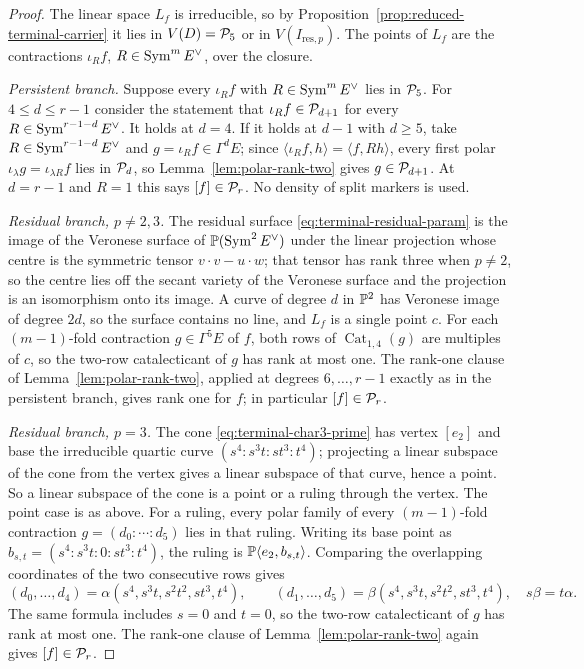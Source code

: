 \begin{proof}
The linear space \(L_f\) is irreducible, so by
Proposition~\ref{prop:reduced-terminal-carrier} it lies in \(V(D)=\mathcal P_5\) or
in \(V(I_{\mathrm{res},p})\).  The points of \(L_f\) are the contractions
\(\iota_Rf\), \(R\in\operatorname{Sym}^mE^\vee\), over the closure.

\emph{Persistent branch.}  Suppose every \(\iota_Rf\) with
\(R\in\operatorname{Sym}^mE^\vee\) lies in \(\mathcal P_5\).  For \(4\leq d\leq r-1\) consider the
statement that \(\iota_Rf\in\mathcal P_{d+1}\) for every
\(R\in\operatorname{Sym}^{r-1-d}E^\vee\).  It holds at \(d=4\).  If it holds at \(d-1\)
with \(d\geq5\), take \(R\in\operatorname{Sym}^{r-1-d}E^\vee\) and \(g=\iota_Rf\in\Gamma^dE\);
since \(\langle\iota_Rf,h\rangle=\langle f,Rh\rangle\), every first polar
\(\iota_\lambda g=\iota_{\lambda R}f\) lies in \(\mathcal P_d\), so
Lemma~\ref{lem:polar-rank-two} gives \(g\in\mathcal P_{d+1}\).  At \(d=r-1\) and
\(R=1\) this says \([f]\in\mathcal P_r\).  No density of split markers is used.

\emph{Residual branch, \(p\neq2,3\).}  The residual surface
\eqref{eq:terminal-residual-param} is the image of the Veronese surface of
\(\mathbb P(\operatorname{Sym}^2E^\vee)\) under the linear projection whose centre is the
symmetric tensor \(v\cdot v-u\cdot w\); that tensor has rank three when
\(p\neq2\), so the centre lies off the secant variety of the Veronese
surface and the projection is an isomorphism onto its image.  A curve of
degree \(d\) in \(\mathbb P^2\) has Veronese image of degree \(2d\), so the
surface contains no line, and \(L_f\) is a single point \(c\).  For each
\((m-1)\)-fold contraction \(g\in\Gamma^5E\) of \(f\), both rows of
\(\operatorname{Cat}_{1,4}(g)\) are multiples of \(c\), so the two-row
catalecticant of \(g\) has rank at most one.  The rank-one clause of
Lemma~\ref{lem:polar-rank-two}, applied at degrees \(6,\ldots,r-1\) exactly
as in the persistent branch, gives rank one for \(f\); in particular
\([f]\in\mathcal P_r\).

\emph{Residual branch, \(p=3\).}  The cone \eqref{eq:terminal-char3-prime}
has vertex \([e_2]\) and base the irreducible quartic curve
\((s^4:s^3t:st^3:t^4)\); projecting a linear subspace of the cone from the
vertex gives a linear subspace of that curve, hence a point.  So a linear
subspace of the cone is a point or a ruling through the vertex.  The point
case is as above.  For a ruling, every polar family of every
\((m-1)\)-fold contraction \(g=(d_0:\cdots:d_5)\) lies in that ruling.
Writing its base point as
\(b_{s,t}=(s^4:s^3t:0:st^3:t^4)\), the ruling is
\(\mathbb P\langle e_2,b_{s,t}\rangle\).  Comparing the overlapping coordinates
of the two consecutive rows gives
\[
 (d_0,\ldots,d_4)=\alpha(s^4,s^3t,s^2t^2,st^3,t^4),\qquad
 (d_1,\ldots,d_5)=\beta(s^4,s^3t,s^2t^2,st^3,t^4),
 \quad s\beta=t\alpha .
\]
The same formula includes \(s=0\) and \(t=0\), so the two-row
catalecticant of \(g\) has rank at most one.  The rank-one clause of
Lemma~\ref{lem:polar-rank-two} again gives \([f]\in\mathcal P_r\).


\end{proof}
